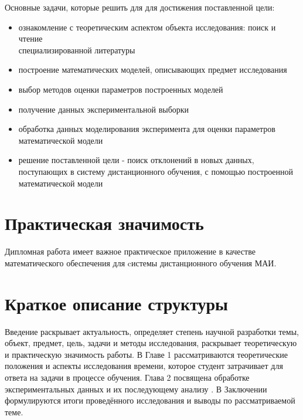 Основные задачи, которые решить для для достижения поставленной цели:
\begin{itemize}
\item ознакомление с теоретическим аспектом объекта исследования: поиск и чтение \\специализированной литературы
\item построение математических моделей, описывающих предмет исследования
\item выбор методов оценки параметров построенных моделей
\item получение данных экспериментальной выборки
\item обработка данных моделирования эксперимента для оценки параметров \\математической модели
\item решение поставленной цели - поиск отклонений в  новых данных, поступающих в систему дистанционного обучения, с помощью построенной математической модели
\end{itemize}


\section{Практическая значимость}

Дипломная работа имеет важное практическое приложение в качестве математического обеспечения для cистемы дистанционного обучения МАИ.

\section{Краткое описание структуры}

Введение раскрывает актуальность, определяет степень научной разработки темы, объект, предмет,  цель, задачи и методы исследования, раскрывает теоретическую и прак\-тическую значимость работы.
В Главе 1 рассматриваются теоретические положения и аспекты исследования времени, которое студент затрачивает для ответа на задачи в процес\-се обучения.
Глава 2 посвящена обработке экспериментальных данных и их последую\-щему анализу .
В Заключении формулируются итоги проведённого исследования и выводы по рассматриваемой теме.
